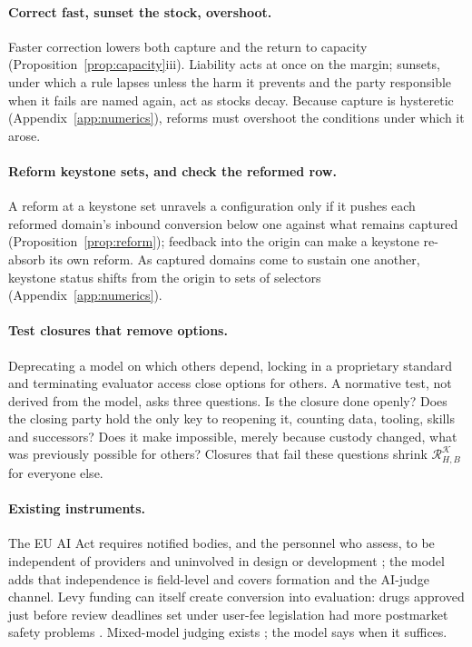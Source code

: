 \documentclass[letterpaper]{article} %
\theoremstyle{definition}
\begin{document}
\paragraph{Correct fast, sunset the stock, overshoot.} Faster correction lowers both capture and the return to capacity (Proposition~\ref{prop:capacity}iii). Liability acts at once on the margin; sunsets, under which a rule lapses unless the harm it prevents and the party responsible when it fails are named again, act as stocks decay. Because capture is hysteretic (Appendix~\ref{app:numerics}), reforms must overshoot the conditions under which it arose.

\paragraph{Reform keystone sets, and check the reformed row.} A reform at a keystone set unravels a configuration only if it pushes each reformed domain's inbound conversion below one against what remains captured (Proposition~\ref{prop:reform}); feedback into the origin can make a keystone re-absorb its own reform. As captured domains come to sustain one another, keystone status shifts from the origin to sets of selectors (Appendix~\ref{app:numerics}).

\paragraph{Test closures that remove options.} Deprecating a model on which others depend, locking in a proprietary standard and terminating evaluator access close options for others. A normative test, not derived from the model, asks three questions. Is the closure done openly? Does the closing party hold the only key to reopening it, counting data, tooling, skills and successors? Does it make impossible, merely because custody changed, what was previously possible for others? Closures that fail these questions shrink $\mathcal R^{\mathcal K}_{H,B}$ for everyone else.

\paragraph{Existing instruments.} The EU AI Act requires notified bodies, and the personnel who assess, to be independent of providers and uninvolved in design or development \citep{euaiact2024}; the model adds that independence is field-level and covers formation and the AI-judge channel. Levy funding can itself create conversion into evaluation: drugs approved just before review deadlines set under user-fee legislation had more postmarket safety problems \citep{carpenter2008}. Mixed-model judging exists \citep{verga2024}; the model says when it suffices.
\end{document}
